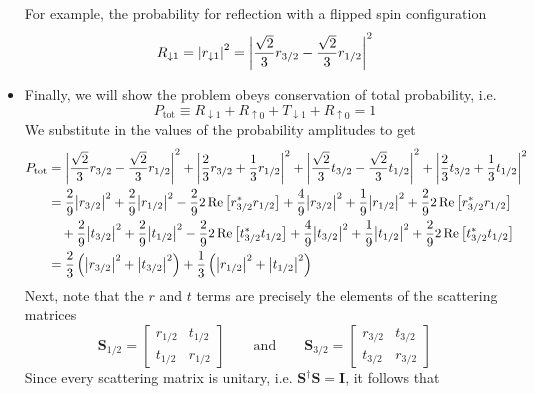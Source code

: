 \documentclass[11pt, a4paper]{article}
\newcommand{\eqtext}[1]{\qquad \text{#1} \qquad}
\newcommand{\mat}[1]{\mathbf{#1}} %
\newcommand{\ua}{\uparrow}  %
\newcommand{\da}{\downarrow}  %
\begin{document}
\begin{itemize}
	For example, the probability for reflection with a flipped spin configuration
	\begin{equation*}
		R_{\da 1 } = \abs{r_{\da 1}}^{2} = \abs{\frac{\sqrt{2}}{3}r_{3/2} - \frac{\sqrt{2}}{3}r_{1/2} }^{2}
	\end{equation*}
	
	\item Finally, we will show the problem obeys conservation of total probability, i.e.
	\begin{equation*}
		P_{\text{tot}} \equiv R_{\da 1} + R_{\ua 0} + T_{\da 1} + R_{\ua 0} = 1
	\end{equation*}
	We substitute in the values of the probability amplitudes to get
	\begin{align*}
		P_{\text{tot}} &= \abs{\frac{\sqrt{2}}{3}r_{3/2} - \frac{\sqrt{2}}{3}r_{1/2} }^{2} + \abs{\frac{2}{3}r_{3/2} + \frac{1}{3}r_{1/2}}^{2} + \abs{\frac{\sqrt{2}}{3}t_{3/2} - \frac{\sqrt{2}}{3}t_{1/2} }^{2} + \abs{\frac{2}{3}t_{3/2} + \frac{1}{3}t_{1/2}}^{2}\\
		& = \frac{2}{9}\abs{r_{3/2}}^{2} + \frac{2}{9}\abs{r_{1/2}}^{2}  - \frac{2}{9} 2 \Re \big[r^{*}_{3/2}r_{1/2}\big] + \frac{4}{9}\abs{r_{3/2}}^{2} + \frac{1}{9}\abs{r_{1/2}}^{2} + \frac{2}{9} 2 \Re \big[r^{*}_{3/2}r_{1/2}\big]  \\ 
		& {}\quad + \frac{2}{9}\abs{t_{3/2}}^{2} + \frac{2}{9}\abs{t_{1/2}}^{2}  - \frac{2}{9} 2 \Re \big[t^{*}_{3/2}t_{1/2}\big] + \frac{4}{9}\abs{t_{3/2}}^{2} + \frac{1}{9}\abs{t_{1/2}}^{2} + \frac{2}{9} 2 \Re \big[t^{*}_{3/2}t_{1/2}\big] \\
		& = \frac{2}{3}\left(\abs{r_{3/2}}^{2} + \abs{t_{3/2}}^{2}\right) + \frac{1}{3}\left(\abs{r_{1/2}}^{2} + \abs{t_{1/2}}^{2}\right) 
	\end{align*}
	Next, note that the $ r $ and $ t $ terms are precisely the elements of the scattering matrices
	\begin{equation*}
		\mat{S}_{1/2} = 
		\begin{bmatrix}
			r_{1/2} & t_{1/2}\\
			t_{1/2} & r_{1/2}
		\end{bmatrix}
		\eqtext{and}
		\mat{S}_{3/2} = 
			\begin{bmatrix}
				r_{3/2} & t_{3/2}\\
				t_{3/2} & r_{3/2}
			\end{bmatrix}
	\end{equation*}
	Since every scattering matrix is unitary, i.e. $ \mat{S}^{\dagger}\mat{S} = \mat{I} $, it follows that 
	\begin{equation*}

\end{equation*}
\end{itemize}
\end{document}
